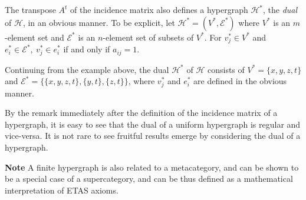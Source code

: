 \documentclass[12pt]{article}
\begin{document}
The transpose $A^t$ of the incidence matrix also defines a hypergraph $\mathcal{H}^*$, the \emph{dual} of $\mathcal{H}$, in an obvious manner.  To be explicit, let $\mathcal{H}^* = (V^*, \mathcal{E}^*)$ where $V^*$ is an $m$-element set and $\mathcal{E}^*$ is an $n$-element set of subsets of $V^*$.  For $v^*_j \in V^*$ and $e^*_i \in \mathcal{E}^*, ~ v^*_j \in e^*_i$ if and only if $a_{ij} = 1$.

Continuing from the example above, the dual $\mathcal{H}^*$ of $\mathcal{H}$ consists of $V^*=\lbrace x,y,z,t\rbrace$ and $\mathcal{E}^*=\lbrace \lbrace x,y,z,t\rbrace, \lbrace y,t\rbrace, \lbrace z,t\rbrace \rbrace$, where $v^*_j$ and $e^*_i$ are defined in the obvious manner.

By the remark immediately after the definition of the incidence matrix of a hypergraph, it is easy to see that the dual of a uniform hypergraph is regular and vice-versa.  It is not rare to see fruitful results emerge by considering the dual of a hypergraph.

\textbf{Note}
A finite hypergraph is also related to a metacategory, and can be shown to be a special case of a supercategory, and can be thus defined as a mathematical interpretation of ETAS axioms.

\end{document}
